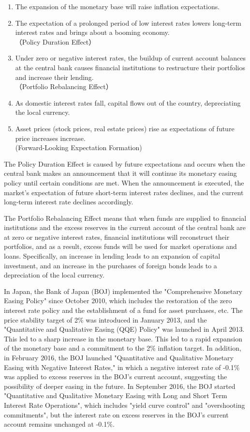 \documentclass[12pt]{article}
\begin{document}
\begin{enumerate}
    \setlength{\leftskip}{30pt}
    \item The expansion of the monetary base will raise inflation expectations.
    \item The expectation of a prolonged period of low interest rates lowers long-term interest rates and brings about a booming economy.\\（Policy Duration Effect）
    \item Under zero or negative interest rates, the buildup of current account balances at the central bank causes financial institutions to restructure their portfolios and increase their lending.\\（Portfolio Rebalancing Effect）
    \item As domestic interest rates fall, capital flows out of the country, depreciating the local currency.
    \item Asset prices (stock prices, real estate prices) rise as expectations of future price increases increase.\\ (Forward-Looking Expectation Formation)
\end{enumerate}

The Policy Duration Effect is caused by future expectations and occurs when the central bank makes an announcement that it will continue its monetary easing policy until certain conditions are met.
When the announcement is executed, the market's expectation of future short-term interest rates declines, and the current long-term interest rate declines accordingly.

The Portfolio Rebalancing Effect means that when funds are supplied to financial institutions and the excess reserves in the current account of the central bank are at zero or negative interest rates, financial institutions will reconstruct their portfolios,
and as a result, excess funds will be used for market operations and loans.
Specifically, an increase in lending leads to an expansion of capital investment, and an increase in the purchases of foreign bonds leads to a depreciation of the local currency.

In Japan, the Bank of Japan (BOJ) implemented the "Comprehensive Monetary Easing Policy" since October 2010, which includes the restoration of the zero interest rate policy and the establishment of a fund for asset purchases, etc.
The price stability target of 2\% was introduced in January 2013, and the "Quantitative and Qualitative Easing (QQE) Policy" was launched in April 2013. This led to a sharp increase in the monetary base.
This led to a rapid expansion of the monetary base and a commitment to the 2\% inflation target.
In addition, in February 2016, the BOJ launched "Quantitative and Qualitative Monetary Easing with Negative Interest Rates," in which a negative interest rate of -0.1\% was applied to excess reserves in the BOJ's current account, suggesting the possibility of deeper easing in the future.
In September 2016, the BOJ started "Quantitative and Qualitative Monetary Easing with Long and Short Term Interest Rate Operations", which includes "yield curve control" and "overshooting commitments", but the interest rate on excess reserves in the BOJ's current account remains unchanged at -0.1\%.
\end{document}
